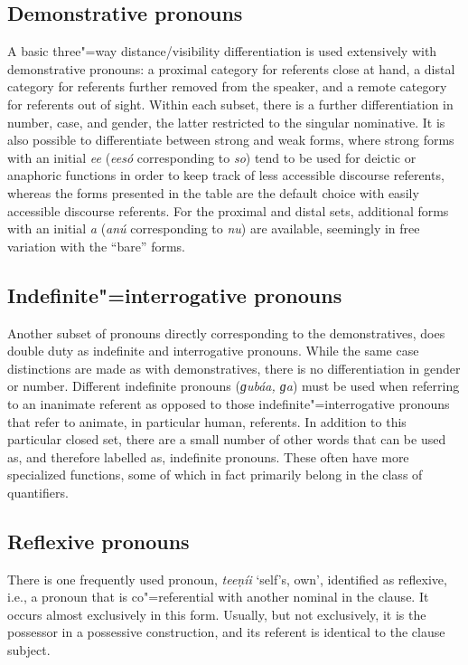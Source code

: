 \subsection{Demonstrative pronouns}
\label{subsec:3b-6-2}
A basic three"=way distance/visibility differentiation is used extensively with demonstrative pronouns: a proximal category for referents close at hand, a distal category for referents further removed from the speaker, and a remote category for referents out of sight. Within each subset, there is a further differentiation in number, case, and gender, the latter restricted to the singular nominative. It is also possible to differentiate between strong and weak forms, where strong forms with an initial \textit{ee} (\textit{eesó} corresponding to \textit{so}) tend to be used for deictic or anaphoric functions in order to keep track of less accessible discourse referents, whereas the forms presented in the table are the default choice with easily accessible discourse referents. For the proximal and distal sets, additional forms with an initial \textit{a} (\textit{anú} corresponding to \textit{nu}) are available, seemingly in free variation with the ``bare'' forms.


\subsection{Indefinite"=interrogative pronouns}
\label{subsec:3b-6-3}
Another subset of pronouns directly corresponding to the demonstratives, does double duty as indefinite and interrogative pronouns. While the same case distinctions are made as with demonstratives, there is no differentiation in gender or number. Different indefinite pronouns (\textit{ɡubáa, ɡa}) must be used when referring to an inanimate referent as opposed to those indefinite"=interrogative pronouns that refer to animate, in particular human, referents. In addition to this particular closed set, there are a small number of other words that can be used as, and therefore labelled as, indefinite pronouns. These often have more specialized functions, some of which in fact primarily belong in the class of quantifiers.


\subsection{Reflexive pronouns}
\label{subsec:3b-6-4}
There is one frequently used pronoun, \textit{teeṇíi} `self’s, own', identified as reflexive, i.e., a pronoun that is co"=referential with another nominal in the clause. It occurs almost exclusively in this form. Usually, but not exclusively, it is the possessor in a possessive construction, and its referent is identical to the clause subject.


